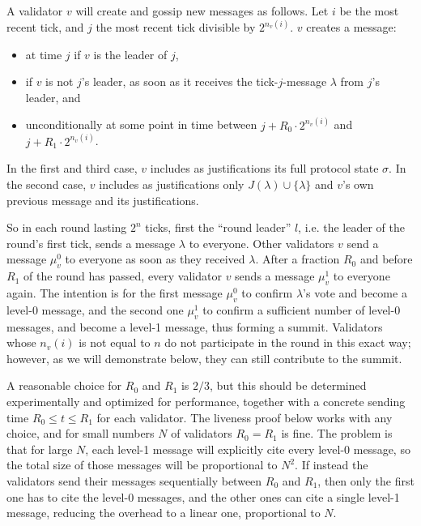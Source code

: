 \documentclass[12pt]{article}
\begin{document}
A validator $v$ will create and gossip new messages as follows. Let $i$ be the most recent tick, and $j$ the most recent tick divisible by $2^{n_v(i)}$. $v$ creates a message:
\begin{itemize}
    \item at time $j$ if $v$ is the leader of $j$,
    \item if $v$ is not $j$'s leader, as soon as it receives the tick-$j$-message $\lambda$ from $j$'s leader, and
    \item unconditionally at some point in time between $j + R_0 \cdot 2^{n_v(i)}$ and $j + R_1 \cdot 2^{n_v(i)}$.
\end{itemize}
In the first and third case, $v$ includes as justifications its full protocol state $\sigma$. In the second case, $v$ includes as justifications only $J(\lambda) \cup \{\lambda\}$ and $v$'s own previous message and its justifications.

So in each round lasting $2^n$ ticks, first the ``round leader'' $l$, i.e. the leader of the round's first tick, sends a message $\lambda$ to everyone. Other validators $v$ send a message $\mu^0_v$ to everyone as soon as they received $\lambda$. After a fraction $R_0$ and before $R_1$ of the round has passed, every validator $v$ sends a message $\mu^1_v$ to everyone again. The intention is for the first message $\mu^0_v$ to confirm $\lambda$'s vote and become a level-0 message, and the second one $\mu^1_v$ to confirm a sufficient number of level-0 messages, and become a level-1 message, thus forming a summit. Validators whose $n_v(i)$ is not equal to $n$ do not participate in the round in this exact way; however, as we will demonstrate below, they can still contribute to the summit.

A reasonable choice for $R_0$ and $R_1$ is $2/3$, but this should be determined experimentally and optimized for performance, together with a concrete sending time $R_0 \leq t \leq R_1$ for each validator. The liveness proof below works with any choice, and for small numbers $N$ of validators $R_0 = R_1$ is fine. The problem is that for large $N$, each level-1 message will explicitly cite every level-0 message, so the total size of those messages will be proportional to $N^2$. If instead the validators send their messages sequentially between $R_0$ and $R_1$, then only the first one has to cite the level-0 messages, and the other ones can cite a single level-1 message, reducing the overhead to a linear one, proportional to $N$.
\end{document}

